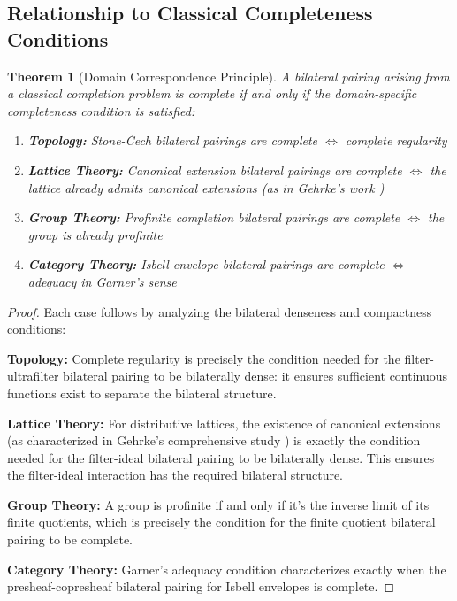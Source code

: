\documentclass[11pt]{article}
\theoremstyle{plain}
\newtheorem{theorem}{Theorem}[section]
\theoremstyle{definition}
\theoremstyle{remark}
\begin{document}
\subsection{Relationship to Classical Completeness Conditions}

\begin{theorem}[Domain Correspondence Principle]\label{thm:domain-correspondence}
A bilateral pairing arising from a classical completion problem is complete if and only if the domain-specific completeness condition is satisfied:

\begin{enumerate}
\item \textbf{Topology:} Stone-\v{C}ech bilateral pairings are complete $\Leftrightarrow$ complete regularity
\item \textbf{Lattice Theory:} Canonical extension bilateral pairings are complete $\Leftrightarrow$ the lattice already admits canonical extensions (as in Gehrke's work \cite{gehrke2001bounded})
\item \textbf{Group Theory:} Profinite completion bilateral pairings are complete $\Leftrightarrow$ the group is already profinite
\item \textbf{Category Theory:} Isbell envelope bilateral pairings are complete $\Leftrightarrow$ adequacy in Garner's sense \cite{garner2018isbell}
\end{enumerate}
\end{theorem}

\begin{proof}
Each case follows by analyzing the bilateral denseness and compactness conditions:

\textbf{Topology:} Complete regularity is precisely the condition needed for the filter-ultrafilter bilateral pairing to be bilaterally dense: it ensures sufficient continuous functions exist to separate the bilateral structure.

\textbf{Lattice Theory:} For distributive lattices, the existence of canonical extensions (as characterized in Gehrke's comprehensive study \cite{gehrke2001bounded}) is exactly the condition needed for the filter-ideal bilateral pairing to be bilaterally dense. This ensures the filter-ideal interaction has the required bilateral structure.

\textbf{Group Theory:} A group is profinite if and only if it's the inverse limit of its finite quotients, which is precisely the condition for the finite quotient bilateral pairing to be complete.

\textbf{Category Theory:} Garner's adequacy condition \cite{garner2018isbell} characterizes exactly when the presheaf-copresheaf bilateral pairing for Isbell envelopes is complete.
\end{proof}
\end{document}
